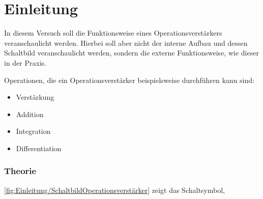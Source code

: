\part{Einleitung}
In diesem Versuch soll die Funktionsweise eines Operationsverstärkers
veranschaulicht werden. Hierbei soll aber nicht der interne Aufbau und dessen 
Schaltbild veranschaulicht werden, sondern die externe Funktionsweise, wie 
dieser in der Praxis.

Operationen, die ein Operationsverstärker beispielsweise durchführen kann sind:
\begin{itemize}[noitemsep,nosep]
	\item Verstärkung
	\item Addition
	\item Integration
	\item Differentiation
\end{itemize}

\section{Theorie}
\cref{fig:Einleitung/SchaltbildOperationsverstärker} zeigt das Schaltsymbol,
